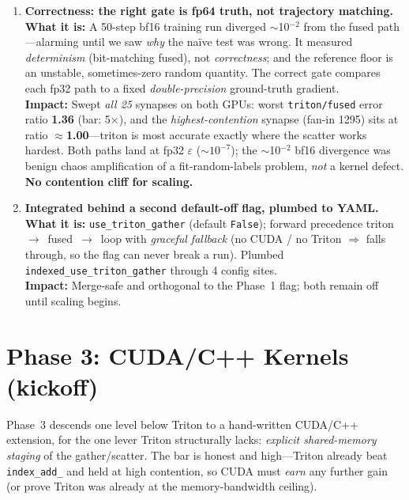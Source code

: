 \documentclass[11pt]{article}
\newcommand{\what}[1]{\textbf{What it is:} #1}
\newcommand{\impact}[1]{\textbf{Impact:} #1}
\begin{document}
\begin{enumerate}[leftmargin=*, resume]
\item \textbf{Correctness: the right gate is fp64 truth, not trajectory matching.}\\
\what{A 50-step bf16 training run diverged $\sim$10$^{-2}$ from the fused path---alarming until we
saw \emph{why} the na\"ive test was wrong. It measured \emph{determinism} (bit-matching fused),
not \emph{correctness}; and the reference floor is an unstable, sometimes-zero random quantity.
The correct gate compares each fp32 path to a fixed \emph{double-precision} ground-truth gradient.}\\
\impact{Swept \emph{all 25} synapses on both GPUs: worst \texttt{triton/fused} error ratio
\textbf{1.36} (bar: 5$\times$), and the \emph{highest-contention} synapse (fan-in 1295) sits at
ratio \textbf{$\approx$1.00}---triton is most accurate exactly where the scatter works hardest.
Both paths land at fp32 $\varepsilon$ ($\sim$$10^{-7}$); the $\sim$10$^{-2}$ bf16 divergence was
benign chaos amplification of a fit-random-labels problem, \emph{not} a kernel defect.
\textbf{No contention cliff for scaling.}}

\item \textbf{Integrated behind a second default-off flag, plumbed to YAML.}\\
\what{\texttt{use\_triton\_gather} (default \texttt{False}); forward precedence
triton~$\rightarrow$~fused~$\rightarrow$~loop with \emph{graceful fallback} (no CUDA / no Triton
$\Rightarrow$ falls through, so the flag can never break a run). Plumbed
\texttt{indexed\_use\_triton\_gather} through 4 config sites.}\\
\impact{Merge-safe and orthogonal to the Phase~1 flag; both remain off until scaling begins.}

\end{enumerate}

\section{Phase 3: CUDA/C++ Kernels (kickoff)}

Phase~3 descends one level below Triton to a hand-written CUDA/C++ extension, for the one lever
Triton structurally lacks: \emph{explicit shared-memory staging} of the gather/scatter. The bar is
honest and high---Triton already beat \texttt{index\_add\_} and held at high contention, so CUDA
must \emph{earn} any further gain (or prove Triton was already at the memory-bandwidth ceiling).
\end{document}
